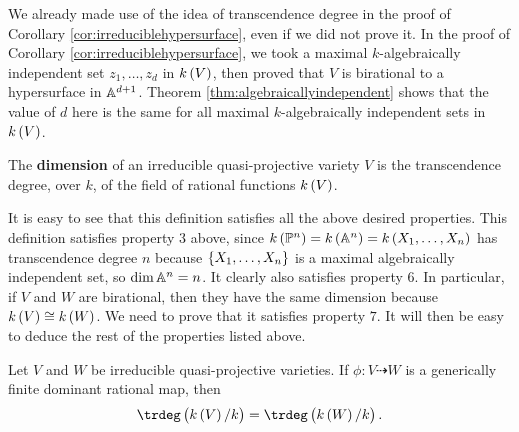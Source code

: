 \begin{note*}
We already made use of the idea of transcendence degree in the proof of Corollary \ref{cor:irreduciblehypersurface}, even if we did not prove it. In the proof of Corollary \ref{cor:irreduciblehypersurface}, we took a maximal $ k $-algebraically independent set $ z_1, \dots, z_d $ in $ k\br{V} $, then proved that $ V $ is birational to a hypersurface in $ \AA^{d + 1} $. Theorem \ref{thm:algebraicallyindependent} shows that the value of $ d $ here is the same for all maximal $ k $-algebraically independent sets in $ k\br{V} $.
\end{note*}

\pagebreak

\begin{definition*}
The \textbf{dimension} of an irreducible quasi-projective variety $ V $ is the transcendence degree, over $ k $, of the field of rational functions $ k\br{V} $.
\end{definition*}

It is easy to see that this definition satisfies all the above desired properties. This definition satisfies property $ 3 $ above, since $ k\br{\PP^n} = k\br{\AA^n} = k\br{X_1, \dots, X_n} $ has transcendence degree $ n $ because $ \cbr{X_1, \dots, X_n} $ is a maximal algebraically independent set, so $ \dim \AA^n = n $. It clearly also satisfies property $ 6 $. In particular, if $ V $ and $ W $ are birational, then they have the same dimension because $ k\br{V} \cong k\br{W} $. We need to prove that it satisfies property $ 7 $. It will then be easy to deduce the rest of the properties listed above.

\begin{lemma}
Let $ V $ and $ W $ be irreducible quasi-projective varieties. If $ \phi : V \dashrightarrow W $ is a generically finite dominant rational map, then
$$ \trdeg\br{k\br{V} / k} = \trdeg\br{k\br{W} / k}. $$
\end{lemma}

